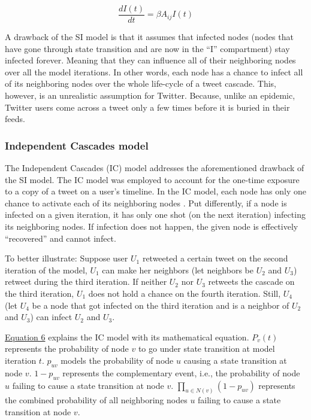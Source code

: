 \documentclass[11pt,a4paper]{article}
\begin{document}
        \begin{equation}
            \frac{dI(t)}{dt} = \beta A_{ij} I(t)
        \end{equation}

        A drawback of the SI model is that it assumes that infected nodes (nodes that have gone through state transition and are now in the “I” compartment) stay infected forever. Meaning that they can influence all of their neighboring nodes over all the model iterations. In other words, each node has a chance to infect all of its neighboring nodes over the whole life-cycle of a tweet cascade. This, however, is an unrealistic assumption for Twitter. Because, unlike an epidemic, Twitter users come across a tweet only a few times before it is buried in their feeds.
        
        \subsubsection{Independent Cascades model}
        The Independent Cascades (IC) model addresses the aforementioned drawback of the SI model. The IC model was employed to account for the one-time exposure to a copy of a tweet on a user's timeline. In the IC model, each node has only one chance to activate each of its neighboring nodes \cite{kempe_maximizing_2003}. Put differently, if a node is infected on a given iteration, it has only one shot (on the next iteration) infecting its neighboring nodes. If infection does not happen, the given node is effectively \enquote{recovered} and cannot infect.
        
        To better illustrate: Suppose user $U_1$ retweeted a certain tweet on the second iteration of the model, $U_1$ can make her neighbors (let neighbors be $U_2$ and $U_3$) retweet during the third iteration. If neither $U_2$ nor $U_3$ retweets the cascade on the third iteration, $U_1$ does not hold a chance on the fourth iteration. Still, $U_4$ (let $U_4$ be a node that got infected on the third iteration and is a neighbor of $U_2$ and $U_3$) can infect $U_2$ and $U_3$.    
        
        \hyperlink{eq:IC}{Equation 6} explains the IC model with its mathematical equation. $P_v(t)$ represents the probability of node $v$ to go under state transition at model iteration $t$. $p_{uv}$ models the probability of node $u$ causing a state transition at node $v$. $1-p_{uv}$ represents the complementary event, i.e., the probability of node $u$ failing to cause a state transition at node $v$. $\prod_{u \in N(v)} (1 - p_{uv})$ represents the combined probability of all neighboring nodes $u$ failing to cause a state transition at node $v$.
        
\end{document}
